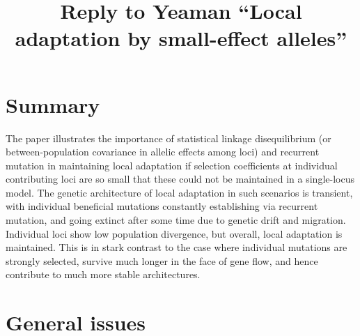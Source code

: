 \documentclass[11pt]{article}
\title{Reply to Yeaman ``Local adaptation by small-effect alleles''}
\begin{document}
\maketitle

\section{Summary}
The paper illustrates the importance of statistical linkage disequilibrium (or between-population covariance in allelic effects among loci) and recurrent mutation in maintaining local adaptation if selection coefficients at individual contributing loci are so small that these could not be maintained in a single-locus model. The genetic architecture of local adaptation in such scenarios is transient, with individual beneficial mutations constantly establishing via recurrent mutation, and going extinct after some time due to genetic drift and migration. Individual loci show low population divergence, but overall, local adaptation is maintained. This is in stark contrast to the case where individual mutations are strongly selected, survive much longer in the face of gene flow, and hence contribute to much more stable architectures.

\section{General issues}
\end{document}
